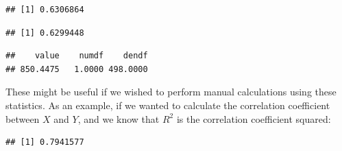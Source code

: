 \documentclass[]{book}
\newenvironment{Shaded}{\begin{snugshade}}{\end{snugshade}}
\newcommand{\KeywordTok}[1]{\textcolor[rgb]{0.13,0.29,0.53}{\textbf{#1}}}
\newcommand{\CommentTok}[1]{\textcolor[rgb]{0.56,0.35,0.01}{\textit{#1}}}
\newcommand{\OperatorTok}[1]{\textcolor[rgb]{0.81,0.36,0.00}{\textbf{#1}}}
\newcommand{\NormalTok}[1]{#1}
\theoremstyle{definition}
\theoremstyle{definition}
\theoremstyle{definition}
\theoremstyle{remark}
\begin{document}
\begin{verbatim}
## [1] 0.6306864
\end{verbatim}

\begin{Shaded}
\end{Shaded}

\begin{verbatim}
## [1] 0.6299448
\end{verbatim}

\begin{Shaded}
\end{Shaded}

\begin{verbatim}
##    value    numdf    dendf 
## 850.4475   1.0000 498.0000
\end{verbatim}

These might be useful if we wished to perform manual calculations using
these statistics. As an example, if we wanted to calculate the
correlation coefficient between \(X\) and \(Y\), and we know that
\(R^2\) is the correlation coefficient squared:

\begin{Shaded}
\end{Shaded}

\begin{verbatim}
## [1] 0.7941577
\end{verbatim}

\begin{Shaded}
\end{Shaded}
\end{document}
